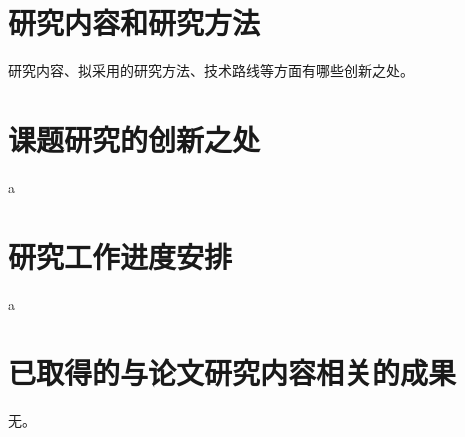 \documentclass[a4paper,10pt]{article}
\begin{document}
\section{研究内容和研究方法} 

研究内容、拟采用的研究方法、技术路线等方面有哪些创新之处。

\section{课题研究的创新之处}

a

\section{研究工作进度安排}

a

\section{已取得的与论文研究内容相关的成果} 

无。



\end{document}

